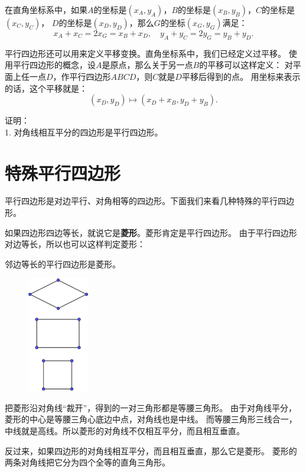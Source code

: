 \documentclass[12pt,UTF8]{ctexbook}
\begin{document}
在直角坐标系中，如果$A$的坐标是$(x_A, y_A)$，$B$的坐标是$(x_B, y_B)$，$C$的坐标是$(x_C, y_C)$，
$D$的坐标是$(x_D, y_D)$，那么$G$的坐标$(x_G, y_G)$满足：
$$ x_A + x_C = 2 x_G = x_B + x_D, \quad y_A + y_C = 2 y_G = y_B + y_D. $$

平行四边形还可以用来定义平移变换。直角坐标系中，我们已经定义过平移。
使用平行四边形的概念，设$A$是原点，那么关于另一点$B$的平移可以这样定义：
对平面上任一点$D$，作平行四边形$ABCD$，则$C$就是$D$平移后得到的点。
用坐标来表示的话，这个平移就是：
$$ (x_D, y_D) \mapsto (x_D + x_B, y_D + y_B).$$

\begin{xt}\label{xt:0-0-0}
    证明：\\
    1. 对角线相互平分的四边形是平行四边形。
\end{xt}

\section{特殊平行四边形}
平行四边形是对边平行、对角相等的四边形。下面我们来看几种特殊的平行四边形。

如果四边形四边等长，就说它是\textbf{菱形}。菱形肯定是平行四边形。
由于平行四边形对边等长，所以也可以这样判定菱形：
\begin{tm}\label{tm:0-1-0}
    邻边等长的平行四边形是菱形。
\end{tm}

\begin{figure} %
    \centering
    \includegraphics[width=0.24\textwidth]{tu/特殊平行四边形.png}
\end{figure}

把菱形沿对角线“裁开”，得到的一对三角形都是等腰三角形。
由于对角线平分，菱形的中心是等腰三角心底边中点，对角线也是中线。
而等腰三角形三线合一，中线就是高线。所以菱形的对角线不仅相互平分，而且相互垂直。

反过来，如果四边形的对角线相互平分，而且相互垂直，那么它是菱形。
菱形的两条对角线把它分为四个全等的直角三角形。
\end{document}
